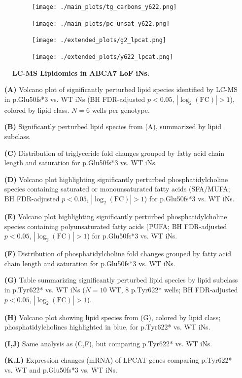\begin{figure}[H]
\begin{subfigure}[t]{.3\textwidth}
        \caption{}
        \texttt{[image: ./main\_plots/tg\_carbons\_y622.png]}        
    \end{subfigure} 
    \begin{subfigure}[t]{.3\textwidth}
        \caption{}
        \texttt{[image: ./main\_plots/pc\_unsat\_y622.png]}        
    \end{subfigure} 
    \begin{subfigure}[t]{.2\textwidth}
        \caption{}
        \texttt{[image: ./extended\_plots/g2\_lpcat.png]}        
    \end{subfigure} 
    \begin{subfigure}[t]{.2\textwidth}
        \caption{}
        \texttt{[image: ./extended\_plots/y622\_lpcat.png]}        
    \end{subfigure} 
    \caption{
        \textbf{LC-MS Lipidomics in ABCA7 LoF iNs.}\\
    }
    \label{fig:main_lipids}
\end{figure}
\begin{itemize}
    \item[\textbf{(A)}] Volcano plot of significantly perturbed lipid species identified by LC-MS in p.Glu50fs*3 vs. WT iNs (BH FDR-adjusted $p<0.05$, $|\log_2(\text{FC})|>1$), colored by lipid class. $N=6$ wells per genotype.
    \item[\textbf{(B)}] Significantly perturbed lipid species from (A), summarized by lipid subclass.
    \item[\textbf{(C)}] Distribution of triglyceride fold changes grouped by fatty acid chain length and saturation for p.Glu50fs*3 vs. WT iNs.
    \item[\textbf{(D)}] Volcano plot highlighting significantly perturbed phosphatidylcholine species containing saturated or monounsaturated fatty acids (SFA/MUFA; BH FDR-adjusted $p<0.05$, $|\log_2(\text{FC})|>1$) for p.Glu50fs*3 vs. WT iNs.
    \item[\textbf{(E)}] Volcano plot highlighting significantly perturbed phosphatidylcholine species containing polyunsaturated fatty acids (PUFA; BH FDR-adjusted $p<0.05$, $|\log_2(\text{FC})|>1$) for p.Glu50fs*3 vs. WT iNs.
    \item[\textbf{(F)}] Distribution of phosphatidylcholine fold changes grouped by fatty acid chain length and saturation for p.Glu50fs*3 vs. WT iNs.
    \item[\textbf{(G)}] Table summarizing significantly perturbed lipid species by lipid subclass in p.Tyr622* vs. WT iNs ($N=10$ WT, $8$ p.Tyr622* wells; BH FDR-adjusted $p<0.05$, $|\log_2(\text{FC})|>1$).
    \item[\textbf{(H)}] Volcano plot showing lipid species from (G), colored by lipid class; phosphatidylcholines highlighted in blue, for p.Tyr622* vs. WT iNs.
    \item[\textbf{(I,J)}] Same analysis as (C,F), but comparing p.Tyr622* vs. WT iNs.
    \item[\textbf{(K,L)}] Expression changes (mRNA) of LPCAT genes comparing p.Tyr622* vs. WT and p.Glu50fs*3 vs. WT iNs.
\end{itemize}